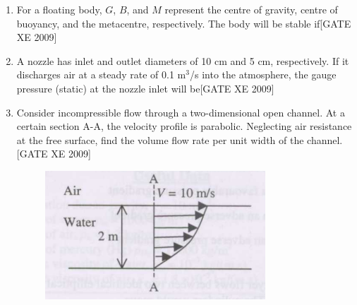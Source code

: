 \documentclass[journal,12pt,onecolumn]{IEEEtran}
\theoremstyle{remark}
\begin{document}
\begin{enumerate}
\item For a floating body, $G$, $B$, and $M$ represent the centre of gravity, centre of buoyancy, and the metacentre, respectively. The body will be stable if\hfill[GATE XE 2009]

\begin{enumerate}
\end{enumerate}



\item A nozzle has inlet and outlet diameters of 10 cm and 5 cm, respectively. If it discharges air at a steady rate of 0.1 m$^3$/s into the atmosphere, the gauge pressure (static) at the nozzle inlet will be\hfill[GATE XE 2009]

\begin{enumerate}
\end{enumerate}




\item Consider incompressible flow through a two-dimensional open channel. At a certain section A-A, the velocity profile is parabolic. Neglecting air resistance at the free surface, find the volume flow rate per unit width of the channel.\hfill[GATE XE 2009]\\
\begin{figure}[h]
\includegraphics[width=0.5\columnwidth]{figs/fig2.png}
\centering
\end{figure}\\
\begin{enumerate}
\end{enumerate}





\end{enumerate}
\end{document}
